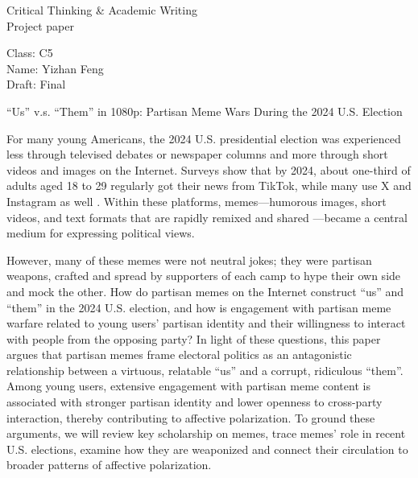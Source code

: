\documentclass[12pt,twoside]{article}
\begin{document}
{\fontsize{16}{35}\selectfont
Critical Thinking \& Academic Writing\\
Project paper\par
}

\vspace{-0.5\baselineskip}

Class: C5 \\
Name: Yizhan Feng \\
Draft: Final \\

\vspace{-0.75\baselineskip}

\begin{center}
{\fontsize{14}{17}\selectfont
``Us'' v.s. ``Them'' in 1080p: Partisan Meme Wars During the 2024 U.S. Election\par
}
\end{center}

\vspace{-\baselineskip}


For many young Americans, the 2024 U.S. presidential election was experienced less through televised debates or newspaper columns and more through short videos and images on the Internet. Surveys show that by 2024, about one-third of adults aged 18 to 29 regularly got their news from TikTok, while many use X and Instagram as well \parencite{shearer2024newsTikTokXFacebookInstagram}. Within these platforms, memes---humorous images, short videos, and text formats that are rapidly remixed and shared \parencite[39]{shifman2013memesdigitalculture}---became a central medium for expressing political views.

However, many of these memes were not neutral jokes; they were partisan weapons, crafted and spread by supporters of each camp to hype their own side and mock the other. How do partisan memes on the Internet construct ``us'' and ``them'' in the 2024 U.S. election, and how is engagement with partisan meme warfare related to young users' partisan identity and their willingness to interact with people from the opposing party? In light of these questions, this paper argues that partisan memes frame electoral politics as an antagonistic relationship between a virtuous, relatable ``us'' and a corrupt, ridiculous ``them''. Among young users, extensive engagement with partisan meme content is associated with stronger partisan identity and lower openness to cross-party interaction, thereby contributing to affective polarization. To ground these arguments, we will review key scholarship on memes, trace memes' role in recent U.S. elections, examine how they are weaponized and connect their circulation to broader patterns of affective polarization.
\end{document}
